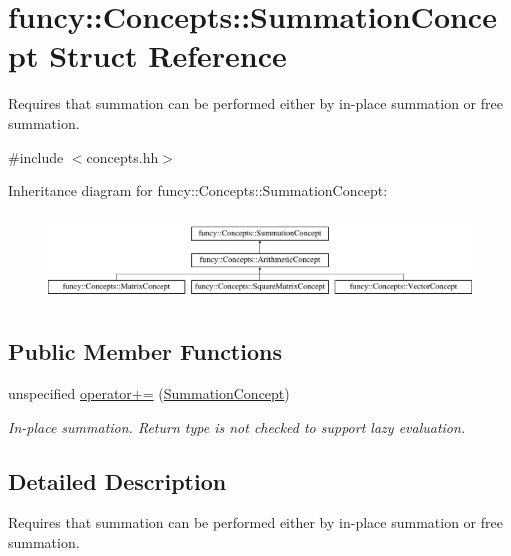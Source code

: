 \hypertarget{structfuncy_1_1Concepts_1_1SummationConcept}{\section{funcy\-:\-:Concepts\-:\-:Summation\-Concept Struct Reference}
\label{structfuncy_1_1Concepts_1_1SummationConcept}
}


Requires that summation can be performed either by in-\/place summation or free summation.  




{\ttfamily \#include $<$concepts.\-hh$>$}

Inheritance diagram for funcy\-:\-:Concepts\-:\-:Summation\-Concept\-:\begin{figure}[H]
\begin{center}
\leavevmode
\includegraphics[height=2.343096cm]{structfuncy_1_1Concepts_1_1SummationConcept}
\end{center}
\end{figure}
\subsection*{Public Member Functions}
\begin{DoxyCompactItemize}
\item 
unspecified \hyperlink{structfuncy_1_1Concepts_1_1SummationConcept_a8586eaf2ca110d3f5536fe05aa08f6f0}{operator+=} (\hyperlink{structfuncy_1_1Concepts_1_1SummationConcept}{Summation\-Concept})
\begin{DoxyCompactList}\small\item\em In-\/place summation. Return type is not checked to support lazy evaluation. \end{DoxyCompactList}\end{DoxyCompactItemize}


\subsection{Detailed Description}
Requires that summation can be performed either by in-\/place summation or free summation. 


